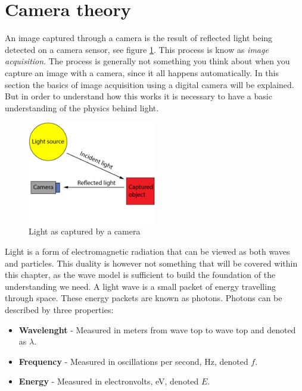 \section{Camera theory}

An image captured through a camera is the result of reflected light being detected on a camera sensor, see figure \ref{fig:light_cam}. This process is know as \textit{image acquisition}. The process is generally not something you think about when you capture an image with a camera, since it all happens automatically. In this section the basics of image acquisition using a digital camera will be explained. But in order to understand how this works it is necessary to have a basic understanding of the physics behind light.

\begin{figure}[htbp] 
\centering 
\includegraphics[width=0.5\textwidth]{Pictures/Theory/light_from_sun.png} 
\caption{Light as captured by a camera} 
\label{fig:light_cam} 
\end{figure}

Light is a form of electromagnetic radiation that can be viewed as both waves and particles. This duality is however not something that will be covered within this chapter, as the wave model is sufficient to build the foundation of the understanding we need. A light wave is a small packet of energy travelling through space. These energy packets are known as photons. Photons can be described by three properties:

\begin{itemize}
\item \textbf{Wavelenght} - Measured in meters from wave top to wave top and denoted as $\lambda$.
\item \textbf{Frequency} - Measured in oscillations per second, Hz, denoted $f$.
\item \textbf{Energy} - Measured in electronvolts, eV, denoted $E$.
\end{itemize}

